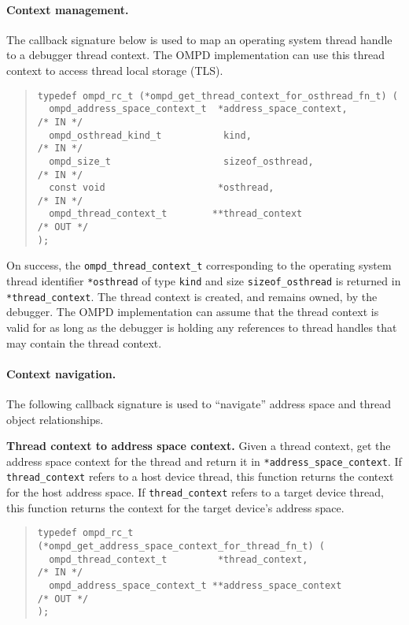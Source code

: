 \paragraph{Context management.}
The callback signature below is used to map an operating system thread
handle to a debugger thread context. 
The OMPD implementation can use this thread context to access thread
local storage (TLS).
\begin{quote}
\begin{lstlisting}
typedef ompd_rc_t (*ompd_get_thread_context_for_osthread_fn_t) (
  ompd_address_space_context_t  *address_space_context,             /* IN */
  ompd_osthread_kind_t           kind,                              /* IN */
  ompd_size_t                    sizeof_osthread,                   /* IN */
  const void                    *osthread,                          /* IN */
  ompd_thread_context_t        **thread_context                    /* OUT */
);
\end{lstlisting}
\end{quote}
On success, the \texttt{ompd\_thread\_context\_t} corresponding
to the operating system thread identifier \texttt{*osthread}
of type \texttt{kind} and size \texttt{sizeof\_osthread} is returned
in \texttt{*thread\_context}.
The thread context is created, and remains owned, by the debugger.
The OMPD implementation can assume that the thread context is valid
for as long as the debugger is holding any references to thread handles
that may contain the thread context.

\paragraph{Context navigation.}
The following callback signature is used to ``navigate'' address space
and thread object relationships.

{\bf Thread context to address space context.}
Given a thread context, get the address space context for the thread
and return it in \verb|*address_space_context|. 
If \verb|thread_context| refers to a host device thread, this function
returns the context for the host address space.
If \verb|thread_context| refers to a target device thread, this
function returns the context for the target device's address space.
\begin{quote}
\begin{lstlisting}
typedef ompd_rc_t (*ompd_get_address_space_context_for_thread_fn_t) (
  ompd_thread_context_t         *thread_context,                   /* IN */
  ompd_address_space_context_t **address_space_context            /* OUT */
);
\end{lstlisting}
\end{quote}


